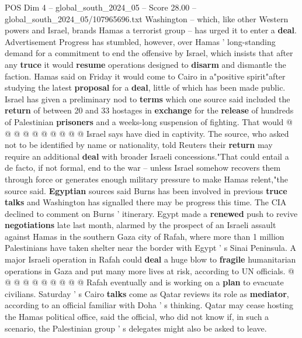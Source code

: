 \begin{textsample}{POS Dim 4 – global\_south\_2024\_05 – Score 28.00 – global\_south\_2024\_05/107965696.txt}
Washington -- which, like other Western powers and Israel, brands Hamas a terrorist group -- has urged it to enter a \textbf{deal}.
Advertisement Progress has stumbled, however, over Hamas ' long-standing demand for a commitment to end the offensive by Israel, which insists that after any \textbf{truce} it would \textbf{resume} operations designed to \textbf{disarm} and dismantle the faction.
Hamas said on Friday it would come to Cairo in a"positive spirit"after studying the latest \textbf{proposal} for a \textbf{deal}, little of which has been made public.
Israel has given a preliminary nod to \textbf{terms} which one source said included the \textbf{return} of between 20 and 33 hostages in \textbf{exchange} for the \textbf{release} of hundreds of Palestinian \textbf{prisoners} and a weeks-long suspension of fighting.
That would @ @ @ @ @ @ @ @ @ @ Israel says have died in captivity.
The source, who asked not to be identified by name or nationality, told Reuters their \textbf{return} may require an additional \textbf{deal} with broader Israeli concessions."That could entail a de facto, if not formal, end to the war -- unless Israel somehow recovers them through force or generates enough military pressure to make Hamas relent,"the source said. \textbf{Egyptian} sources said Burns has been involved in previous \textbf{truce} \textbf{talks} and Washington has signalled there may be progress this time.
The CIA declined to comment on Burns ' itinerary.
Egypt made a \textbf{renewed} push to revive \textbf{negotiations} late last month, alarmed by the prospect of an Israeli assault against Hamas in the southern Gaza city of Rafah, where more than 1 million Palestinians have taken shelter near the border with Egypt ' s Sinai Peninsula.
A major Israeli operation in Rafah could \textbf{deal} a huge blow to \textbf{fragile} humanitarian operations in Gaza and put many more lives at risk, according to UN officials. @ @ @ @ @ @ @ @ @ @ Rafah eventually and is working on a \textbf{plan} to evacuate civilians.
Saturday ' s Cairo \textbf{talks} come as Qatar reviews its role as \textbf{mediator}, according to an official familiar with Doha ' s thinking.
Qatar may cease hosting the Hamas political office, said the official, who did not know if, in such a scenario, the Palestinian group ' s delegates might also be asked to leave.

\end{textsample}
